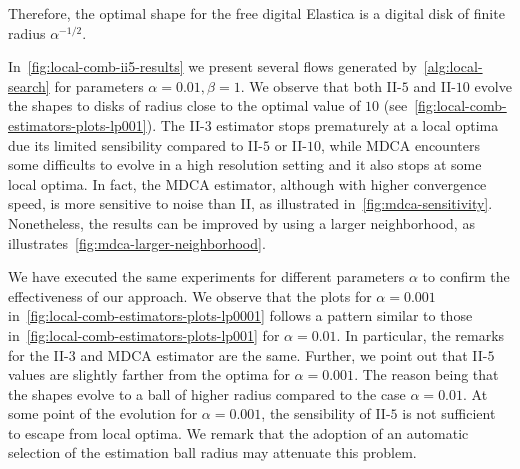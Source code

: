 Therefore, the optimal shape for the free digital Elastica is a digital disk of finite radius $\alpha^{-1/2}$.


In~\cref{fig:local-comb-ii5-results} we present several flows generated by~\cref{alg:local-search} for parameters $\alpha=0.01, \beta=1$. We observe that both II-$5$ and II-$10$ evolve the shapes to disks of radius close to the optimal value of $10$ (see~\cref{fig:local-comb-estimators-plots-lp001}). The II-$3$ estimator stops prematurely at a local optima due its limited sensibility compared to II-$5$ or II-$10$, while MDCA encounters some difficults to evolve in a high resolution setting and it also stops at some local optima. In fact, the MDCA estimator, although with higher convergence speed, is more sensitive to noise than II, as illustrated in~\cref{fig:mdca-sensitivity}. Nonetheless, the results can be improved by using a larger neighborhood, as illustrates~\cref{fig:mdca-larger-neighborhood}.



We have executed the same experiments for different parameters $\alpha$ to confirm the effectiveness of our approach. We observe that the plots for $\alpha=0.001$ in~\cref{fig:local-comb-estimators-plots-lp0001} follows a pattern similar to those in~\cref{fig:local-comb-estimators-plots-lp001} for $\alpha=0.01$. In particular, the remarks for the II-$3$ and MDCA estimator are the same. Further, we point out that II-$5$ values are slightly farther from the optima for $\alpha=0.001$. The reason being that the shapes evolve to a ball of higher radius compared to the case $\alpha=0.01$. At some point of the evolution for $\alpha=0.001$, the sensibility of II-$5$ is not sufficient to escape from local optima. We remark that the adoption of an automatic selection of the estimation ball radius may attenuate this problem.


